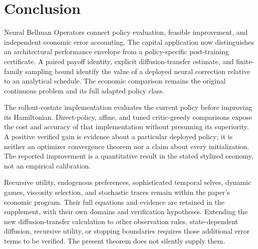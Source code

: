 \section{Conclusion}\label{sec:conclusion}
Neural Bellman Operators connect policy evaluation, feasible improvement, and independent economic error accounting. The capital application now distinguishes an architectural performance envelope from a policy-specific post-training certificate. A paired payoff identity, explicit diffusion-transfer estimate, and finite-family sampling bound identify the value of a deployed neural correction relative to an analytical schedule. The economic comparison remains the original continuous problem and its full adapted policy class.

The rollout-costate implementation evaluates the current policy before improving its Hamiltonian. Direct-policy, affine, and tuned critic-greedy comparisons expose the cost and accuracy of that implementation without presuming its superiority. A positive verified gain is evidence about a particular deployed policy; it is neither an optimizer convergence theorem nor a claim about every initialization. The reported improvement is a quantitative result in the stated stylized economy, not an empirical calibration.

Recursive utility, endogenous preferences, sophisticated temporal selves, dynamic games, viscosity selection, and stochastic traces remain within the paper's economic program. Their full equations and evidence are retained in the supplement, with their own domains and verification hypotheses. Extending the new diffusion-transfer calculation to other observation rules, state-dependent diffusion, recursive utility, or stopping boundaries requires those additional error terms to be verified. The present theorem does not silently supply them.

